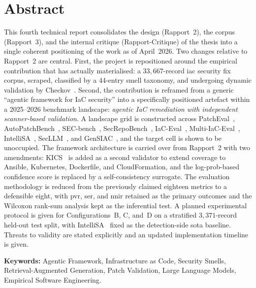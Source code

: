 \documentclass[12pt, a4paper]{report}
\begin{document}
\chapter*{Abstract}

This fourth technical report consolidates the design (Rapport~2), the corpus
(Rapport~3), and the internal critique (Rapport-Critique) of the thesis into
a single coherent positioning of the work as of April~2026. Two changes
relative to Rapport~2 are central. First, the project is repositioned around
the empirical contribution that has actually materialised: a
$33{,}667$-record \gls{iac} security fix corpus, scraped, classified by a
44-entry smell taxonomy, and undergoing dynamic validation by
Checkov~\citep{checkov2024}. Second, the contribution is reframed from a
generic ``agentic framework for IaC security'' into a specifically positioned
artefact within a 2025--2026 benchmark landscape: \emph{agentic IaC
remediation with independent scanner-based validation}. A landscape grid is
constructed across PatchEval~\citep{lyu2024patcheval},
AutoPatchBench~\citep{autopatchbench2025}, SEC-bench~\citep{secbench2025},
SecRepoBench~\citep{secrepobench2025}, IaC-Eval~\citep{kon2024iaceval},
Multi-IaC-Eval~\citep{multi2025iaceval}, IntelliSA~\citep{intellisa2026},
SecLLM~\citep{devito2025secllm}, and GenSIAC~\citep{li2025gensiac}, and the
target cell is shown to be unoccupied. The framework architecture is carried
over from Rapport~2 with two amendments: KICS~\citep{kics2024} is added as a
second validator to extend coverage to Ansible, Kubernetes, Dockerfile, and
CloudFormation, and the log-prob-based confidence score is replaced by a
self-consistency surrogate. The evaluation methodology is reduced from the
previously claimed eighteen metrics to a defensible eight, with \gls{pvr},
\gls{ser}, and \gls{nnir} retained as the primary outcomes and the Wilcoxon
rank-sum analysis kept as the inferential test. A planned experimental
protocol is given for Configurations~B, C, and~D on a stratified $3{,}371$-record
held-out test split, with IntelliSA~\citep{intellisa2026} fixed as the
detection-side \gls{sota} baseline. Threats to validity are stated explicitly
and an updated implementation timeline is given.

\bigskip
\noindent\textbf{Keywords:} Agentic Framework, Infrastructure as Code,
Security Smells, Retrieval-Augmented Generation, Patch Validation, Large
Language Models, Empirical Software Engineering.

\tableofcontents
\listoffigures
\listoftables
\end{document}
